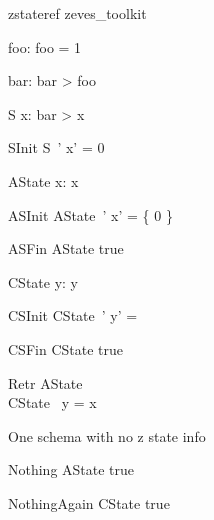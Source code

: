 
\begin{zsection}
   \SECTION zstateref \parents zeves\_toolkit
\end{zsection}

\begin{axdef}
   foo: \nat
\where
   foo = 1
\end{axdef}

\begin{axdef}
   bar: \nat
\where
   bar > foo
\end{axdef}


\begin{schema}{S}
  x: \nat
\where
   bar > x
\end{schema}

\begin{schema}{SInit}
   S~'
\where
   x' = 0
\end{schema}

\begin{schema}{AState}
   x: \power \nat
\where
  x \neq \emptyset
\end{schema}

\begin{schema}{ASInit}
   AState~'
\where
   x' = \{ 0 \}
\end{schema}

\begin{schema}{ASFin}
   AState
\where
   true
\end{schema}

\begin{schema}{CState}
  y: \seq \nat
\where
   y \neq \langle \rangle
\end{schema}

\begin{schema}{CSInit}
   CState~'
\where
  y' =  \rangle
\end{schema}

\begin{schema}{CSFin}
   CState
\where
   true
\end{schema}

\begin{schema}{Retr}
   AState \\
   CState
\where
   \ran~y = x
\end{schema}

One schema with no z state info
\begin{schema}{Nothing}
   \Delta AState
\where
   true
\end{schema}

\begin{schema}{NothingAgain}
   \Delta CState
\where
   true
\end{schema}

